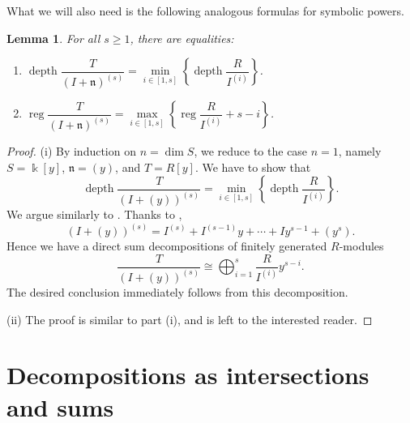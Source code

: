 \documentclass{amsart}
\DeclareMathOperator{\depth}{depth}
\DeclareMathOperator{\reg}{reg}
\newcommand{\nn}{\mathfrak{n}}
\theoremstyle{plain}
\newtheorem{lem}[thm]{Lemma}
\theoremstyle{definition}
\numberwithin{equation}{section}
\newcommand{\kk}{\Bbbk}
\begin{document}
What we will also need is the following analogous formulas for symbolic powers.
\begin{lem}
\label{lem_depthregIplusn_symbolic}
For all $s\ge 1$, there are equalities:
\begin{enumerate}[\quad \rm (i)]
 \item $\depth \dfrac{T}{(I+\nn)^{(s)}}=\min\limits_{i\in [1,s]} \left\{ \depth \dfrac{R}{I^{(i)}} \right\}$.
 \item $\reg \dfrac{T}{(I+\nn)^{(s)}}=\max \limits_{i\in [1,s]} \left\{ \reg \dfrac{R}{I^{(i)}}+s-i \right\}$.
\end{enumerate}
\end{lem}
\begin{proof}

(i) By induction on $n=\dim S$, we reduce to the case $n=1$, namely $S=\kk[y]$, $\nn=(y)$, and $T=R[y]$. We have to show that
\[
\depth \frac{T}{(I+(y))^{(s)}} =\min_{i\in [1,s]} \left\{ \depth \frac{R}{I^{(i)}} \right\}.
\]
We argue similarly to \cite[Proof of Theorem 5.2]{CH+}. Thanks to , 
\[
(I+(y))^{(s)}=I^{(s)}+I^{(s-1)}y+\cdots+Iy^{s-1}+(y^s).
\]
Hence we have a direct sum decompositions of finitely generated $R$-modules
\[
\frac{T}{(I+(y))^{(s)}} \cong \bigoplus_{i=1}^s \frac{R}{I^{(i)}}y^{s-i}.
\]
The desired conclusion immediately follows from this decomposition.

(ii) The proof is similar to part (i), and is left to the interested reader.
\end{proof}


\section{Decompositions as intersections and sums}
\label{sect_decomposition}
\end{document}
